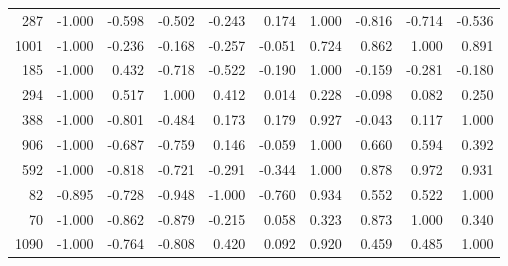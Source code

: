 \begin{longtable}{rrrrrrrrrr}
   287 & -1.000 & -0.598 & -0.502 & -0.243 &  0.174 &  1.000 & -0.816 & -0.714 & -0.536 \\
  1001 & -1.000 & -0.236 & -0.168 & -0.257 & -0.051 &  0.724 &  0.862 &  1.000 &  0.891 \\
   185 & -1.000 &  0.432 & -0.718 & -0.522 & -0.190 &  1.000 & -0.159 & -0.281 & -0.180 \\
   294 & -1.000 &  0.517 &  1.000 &  0.412 &  0.014 &  0.228 & -0.098 &  0.082 &  0.250 \\
   388 & -1.000 & -0.801 & -0.484 &  0.173 &  0.179 &  0.927 & -0.043 &  0.117 &  1.000 \\
   906 & -1.000 & -0.687 & -0.759 &  0.146 & -0.059 &  1.000 &  0.660 &  0.594 &  0.392 \\
   592 & -1.000 & -0.818 & -0.721 & -0.291 & -0.344 &  1.000 &  0.878 &  0.972 &  0.931 \\
    82 & -0.895 & -0.728 & -0.948 & -1.000 & -0.760 &  0.934 &  0.552 &  0.522 &  1.000 \\
    70 & -1.000 & -0.862 & -0.879 & -0.215 &  0.058 &  0.323 &  0.873 &  1.000 &  0.340 \\
  1090 & -1.000 & -0.764 & -0.808 &  0.420 &  0.092 &  0.920 &  0.459 &  0.485 &  1.000 \\
\end{longtable}
